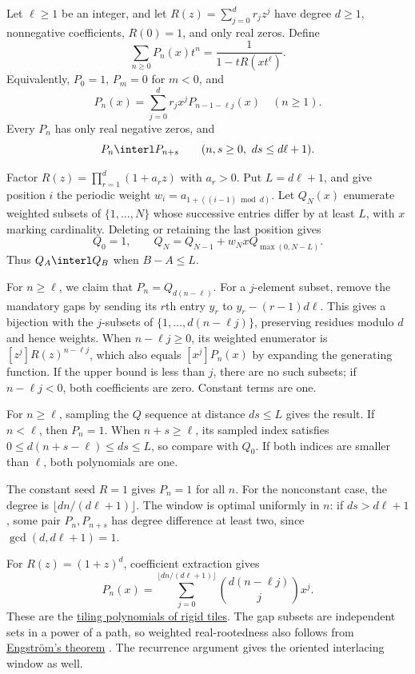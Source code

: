 \begin{theorem}
\label{interlacingRenewalTheorem}
Let $\ell\geq1$ be an integer, and let $R(z)=\sum_{j=0}^d r_jz^j$
have degree $d\geq1$, nonnegative coefficients, $R(0)=1$, and only real zeros.
Define
\[
 \sum_{n\geq0}P_n(x)t^n=\frac1{1-tR(xt^\ell)}.
\]
Equivalently, $P_0=1$, $P_m=0$ for $m<0$, and
\[
 P_n(x)=\sum_{j=0}^d r_jx^jP_{n-1-\ell j}(x)\quad(n\geq1).
\]
Every $P_n$ has only real negative zeros, and
\[
 P_n\interl P_{n+s}\qquad(n,s\geq0,\ ds\leq d\ell+1).
\]
\end{theorem}

\begin{proof*}
Factor $R(z)=\prod_{r=1}^d(1+a_rz)$ with $a_r>0$.
Put $L=d\ell+1$, and give position $i$ the periodic weight
$w_i=a_{1+((i-1)\bmod d)}$.
Let $Q_N(x)$ enumerate weighted subsets of $\{1,\dotsc,N\}$ whose
successive entries differ by at least $L$, with $x$ marking cardinality.
Deleting or retaining the last position gives
\[
 Q_0=1,\qquad Q_N=Q_{N-1}+w_NxQ_{\max(0,N-L)}.
\]
Thus $Q_A\interl Q_B$ when $B-A\leq L$.

For $n\geq\ell$, we claim that $P_n=Q_{d(n-\ell)}$.
For a $j$-element subset, remove the mandatory gaps by sending its
$r$th entry $y_r$ to $y_r-(r-1)d\ell$.
This gives a bijection with the $j$-subsets of
$\{1,\dotsc,d(n-\ell j)\}$, preserving residues modulo $d$ and hence weights.
When $n-\ell j\geq0$, its weighted enumerator is
$[z^j]R(z)^{n-\ell j}$, which also equals $[x^j]P_n(x)$ by expanding
the generating function. If the upper bound is less than $j$, there are
no such subsets; if $n-\ell j<0$, both coefficients are zero.
Constant terms are one.

For $n\geq\ell$, sampling the $Q$ sequence at distance $ds\leq L$
gives the result. If $n<\ell$, then $P_n=1$.
When $n+s\geq\ell$, its sampled index satisfies
$0\leq d(n+s-\ell)\leq ds\leq L$, so compare with $Q_0$.
If both indices are smaller than $\ell$, both polynomials are one.
\end{proof*}

The constant seed $R=1$ gives $P_n=1$ for all $n$.
For the nonconstant case, the degree is $\lfloor dn/(d\ell+1)\rfloor$.
The window is optimal uniformly in $n$: if $ds>d\ell+1$, some pair
$P_n,P_{n+s}$ has degree difference at least two, since
$\gcd(d,d\ell+1)=1$.

For $R(z)=(1+z)^d$, coefficient extraction gives
\[
 P_n(x)=\sum_{j=0}^{\lfloor dn/(d\ell+1)\rfloor}
 \binom{d(n-\ell j)}j x^j.
\]
These are the \hyperref[rigidTilingPolynomials]{tiling polynomials of
rigid tiles}.
The gap subsets are independent sets in a power of a path, so weighted
real-rootedness also follows from
\hyperref[weightedIndependencePolynomial]{Engström's theorem}
\cite[Thm.~2.5]{Engstrom2007}.
The recurrence argument gives the oriented interlacing window as well.


